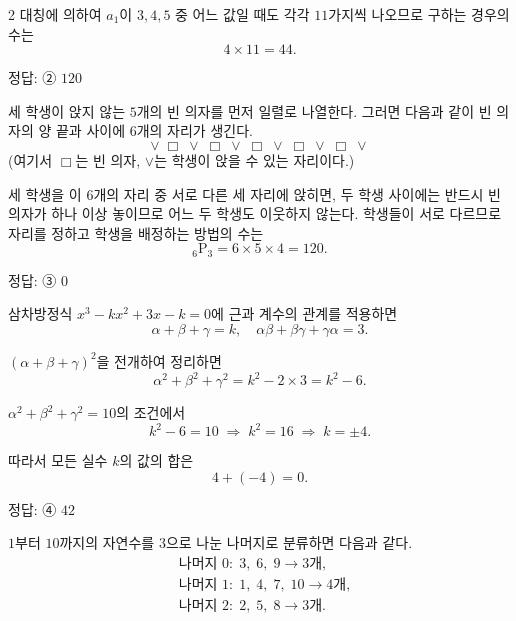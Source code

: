 \documentclass[10pt]{article}
\begin{document}
\begin{multicols}{2}
대칭에 의하여 $a_1$이 $3, 4, 5$ 중 어느 값일 때도 각각 $11$가지씩 나오므로 구하는 경우의 수는
\[ 4 \times 11 = 44. \]

\begin{answerbox}정답: ② $120$\end{answerbox}

세 학생이 앉지 않는 $5$개의 빈 의자를 먼저 일렬로 나열한다. 그러면 다음과 같이 빈 의자의 양 끝과 사이에 $6$개의 자리가 생긴다.
\[ \vee \; \Box \; \vee \; \Box \; \vee \; \Box \; \vee \; \Box \; \vee \; \Box \; \vee \]
(여기서 $\Box$는 빈 의자, $\vee$는 학생이 앉을 수 있는 자리이다.)

세 학생을 이 $6$개의 자리 중 서로 다른 세 자리에 앉히면, 두 학생 사이에는 반드시 빈 의자가 하나 이상 놓이므로 어느 두 학생도 이웃하지 않는다. 학생들이 서로 다르므로 자리를 정하고 학생을 배정하는 방법의 수는
\[ {}_6\mathrm{P}_3 = 6 \times 5 \times 4 = 120. \]

\begin{answerbox}정답: ③ $0$\end{answerbox}

삼차방정식 $x^3 - kx^2 + 3x - k = 0$에 근과 계수의 관계를 적용하면
\[ \alpha + \beta + \gamma = k,\quad \alpha\beta + \beta\gamma + \gamma\alpha = 3. \]

$(\alpha + \beta + \gamma)^2$을 전개하여 정리하면
\[ \alpha^2 + \beta^2 + \gamma^2 = k^2 - 2 \times 3 = k^2 - 6. \]

$\alpha^2 + \beta^2 + \gamma^2 = 10$의 조건에서
\[ k^2 - 6 = 10 \;\Rightarrow\; k^2 = 16 \;\Rightarrow\; k = \pm 4. \]

따라서 모든 실수 $k$의 값의 합은
\[ 4 + (-4) = 0. \]

\begin{answerbox}정답: ④ $42$\end{answerbox}

$1$부터 $10$까지의 자연수를 $3$으로 나눈 나머지로 분류하면 다음과 같다.
\begin{align*}
&\text{나머지 } 0:\; 3,\; 6,\; 9 \to 3\text{개}, \\
&\text{나머지 } 1:\; 1,\; 4,\; 7,\; 10 \to 4\text{개}, \\
&\text{나머지 } 2:\; 2,\; 5,\; 8 \to 3\text{개}.
\end{align*}


\end{multicols}
\end{document}

